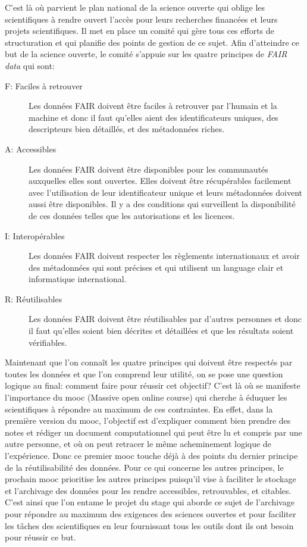 \documentclass[11pt]{article}
\begin{document}
C'est là où parvient le plan national de la science ouverte qui oblige
les scientifiques à rendre ouvert l'accès pour leurs recherches
financées et leurs projets scientifiques. Il met en place un comité
qui gère tous ces efforts de structuration et qui planifie des points
de gestion de ce sujet. Afin d'atteindre ce but de la science ouverte,
le comité s'appuie sur les quatre principes de \emph{FAIR data} qui sont: 
\begin{description}
\item[{F: Faciles à retrouver}] Les données FAIR doivent être faciles à retrouver par l'humain et la
machine et donc il faut qu'elles aient des identificateurs uniques,
des descripteurs bien détaillés, et des métadonnées riches.

\item[{A: Accessibles}] Les données FAIR doivent être disponibles pour les communautés
auxquelles elles sont ouvertes. Elles doivent être récupérables
facilement avec l'utilisation de leur identificateur unique et leurs
métadonnées doivent aussi être disponibles.
Il y a des conditions qui surveillent la disponibilité de ces
données telles que les autorisations et les licences.

\item[{I: Interopérables}] Les données FAIR doivent respecter les règlements internationaux et
avoir des métadonnées qui sont précises et qui utilisent un
language clair et informatique international.

\item[{R: Réutilisables}] Les données FAIR doivent être réutilisables par d'autres personnes
et donc il faut qu'elles soient bien décrites et détaillées et que
les résultats soient vérifiables.
\end{description}

Maintenant que l'on connaît les quatre principes qui doivent être
respectés par toutes les données et que l'on comprend leur utilité,
on se pose une question logique au final: comment faire pour réussir
cet objectif? C'est là où se manifeste l'importance du mooc (Massive
open online course) qui cherche à éduquer les scientifiques à répondre
au maximum de ces contraintes. En effet, dans la première version du
mooc, l'objectif est d'expliquer comment bien prendre des notes et
rédiger un document computationnel qui peut être lu et compris par une
autre personne, et où on peut retracer le même acheminement logique de
l'expérience. Donc ce premier mooc touche déjà à des points du dernier principe de
la réutilisabilité des données. Pour ce qui concerne les autres
principes, le prochain mooc prioritise les autres principes puisqu'il
vise à faciliter le stockage et l'archivage des données pour les
rendre accessibles, retrouvables, et citables. C'est ainsi que l'on
entame le projet du stage qui aborde ce sujet de l'archivage pour
répondre au maximum des exigences des sciences ouvertes et pour
faciliter les tâches des scientifiques en leur fournissant tous les
outils dont ils ont besoin pour réussir ce but. 
\end{document}
